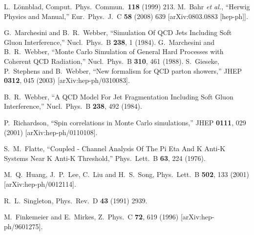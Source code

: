 \documentclass{article}
\begin{document}
\begin{thebibliography}{99}
 L.~L\"onnblad, Comput.~Phys.~Commun.\ {\bf 118} (1999) 213.
  M.~Bahr {\it et al.},
  ``Herwig Physics and Manual,''
  Eur.\ Phys.\ J.\  C {\bf 58} (2008) 639
  [arXiv:0803.0883 [hep-ph]].

  G.~Marchesini and B.~R.~Webber,
  ``Simulation Of QCD Jets Including Soft Gluon Interference,''
  Nucl.\ Phys.\  B {\bf 238}, 1 (1984).
  G.~Marchesini and B.~R.~Webber,
   ``Monte Carlo Simulation of General Hard Processes with Coherent QCD
  Radiation,''
  Nucl.\ Phys.\  B {\bf 310}, 461 (1988).
  S.~Gieseke, P.~Stephens and B.~Webber,
  ``New formalism for QCD parton showers,''
  JHEP {\bf 0312}, 045 (2003)
  [arXiv:hep-ph/0310083].

  B.~R.~Webber,
  ``A QCD Model For Jet Fragmentation Including Soft Gluon Interference,''
  Nucl.\ Phys.\  B {\bf 238}, 492 (1984).

  P.~Richardson,
  ``Spin correlations in Monte Carlo simulations,''
  JHEP {\bf 0111}, 029 (2001)
  [arXiv:hep-ph/0110108].

  S.~M.~Flatte,
   ``Coupled - Channel Analysis Of The Pi Eta And K Anti-K Systems Near K Anti-K
  Threshold,''
  Phys.\ Lett.\  B {\bf 63}, 224 (1976).

  M.~Q.~Huang, J.~P.~Lee, C.~Liu and H.~S.~Song,
  Phys.\ Lett.\  B {\bf 502}, 133 (2001)
  [arXiv:hep-ph/0012114].

  R.~L.~Singleton,
  Phys.\ Rev.\  D {\bf 43} (1991) 2939.

  M.~Finkemeier and E.~Mirkes,
  Z.\ Phys.\  C {\bf 72}, 619 (1996)
  [arXiv:hep-ph/9601275].


\end{thebibliography}
\end{document}
